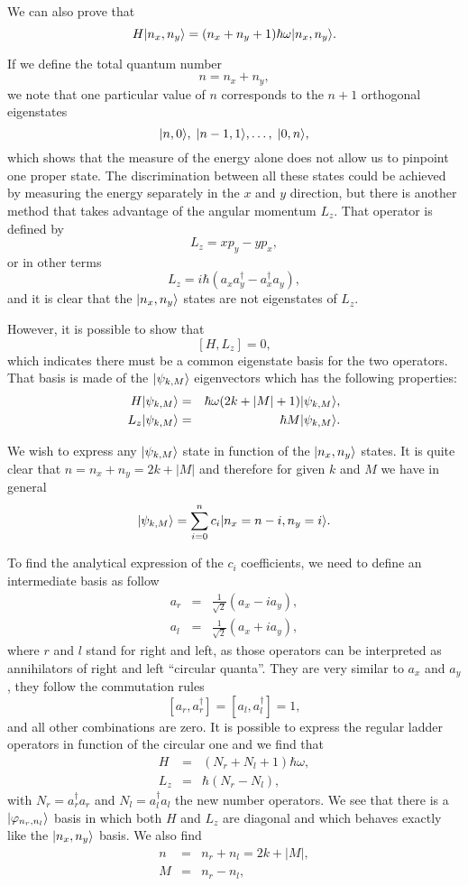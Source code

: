 We can also prove that
\[ H | n_x,n_y \rangle = (n_x + n_y +1) \hbar \omega | n_x,n_y \rangle.\]

If we define the total quantum number
\[ n = n_x + n_y, \]
we note that one particular value of $n$ corresponds to the $n+1$ orthogonal eigenstates
\[ | n,0 \rangle, \; | n-1,1 \rangle, \ldots, \; | 0,n \rangle, \]
which shows that the measure of the energy alone does not allow us to pinpoint one proper state. The discrimination between all these states could be achieved by measuring the energy separately in the $x$ and $y$ direction, but there is another method that takes advantage of the angular momentum $L_z$. That operator is defined by
\[ L_z = x p_y - y p_x,\]
or in other terms
\[ L_z= i\hbar(a_x a_y^\dagger-a_x^\dagger a_y), \]
and it is clear that the $| n_x,n_y \rangle$ states are not eigenstates of $L_z$.

However, it is possible to show that
\[ [H,L_z]=0, \]
which indicates there must be a common eigenstate basis for the two operators. That basis is made of the $| \psi_{k,M} \rangle$ eigenvectors which has the following properties:
\begin{eqnarray}
    H | \psi_{k,M} \rangle &=& \hbar \omega(2k+|M|+1) | \psi_{k,M} \rangle,\\
    L_z | \psi_{k,M} \rangle &=& \hbar M | \psi_{k,M} \rangle.
\end{eqnarray}

We wish to express any $| \psi_{k,M} \rangle$ state in function of the $| n_x,n_y \rangle$ states. It is quite clear that $n=n_x+n_y=2k+|M|$ and therefore for given $k$ and $M$ we have in general
\[ | \psi_{k,M} \rangle = \sum_{i=0}^n c_i | n_x=n-i, n_y=i \rangle. \label{eq-2Dsum}\]

To find the analytical expression of the $c_i$ coefficients, we need to define an intermediate basis as follow
\begin{eqnarray}
    a_r &=& \frac{1}{\sqrt 2} \left(a_x-ia_y \right), \\
    a_l &=& \frac{1}{\sqrt 2} \left(a_x+ia_y \right),
\end{eqnarray}
where $r$ and $l$ stand for right and left, as those operators can be interpreted as annihilators of right and left  ``circular quanta''. They are very similar to $a_x$ and $a_y$, they follow the commutation rules
\[ [a_r,a^\dagger_r]= [a_l,a^\dagger_l]=1, \]
and all other combinations are zero. It is possible to express the regular ladder operators in function of the circular one and we find that
\begin{eqnarray}
    H&=&(N_r + N_l +1) \hbar \omega,\\
    L_z &=& \hbar (N_r- N_l) ,
\end{eqnarray}
with $N_r=a^\dagger_r a_r$ and $N_l=a^\dagger_l a_l$ the new number operators. We see that there is a $| \varphi_{n_r,n_l} \rangle$ basis in which both $H$ and $L_z$ are diagonal and which behaves exactly like the $| n_x,n_y \rangle$ basis. We also find
\begin{eqnarray}
    n &=& n_r + n_l = 2k+ |M|, \\
    M &=& n_r - n_l,
\end{eqnarray}

